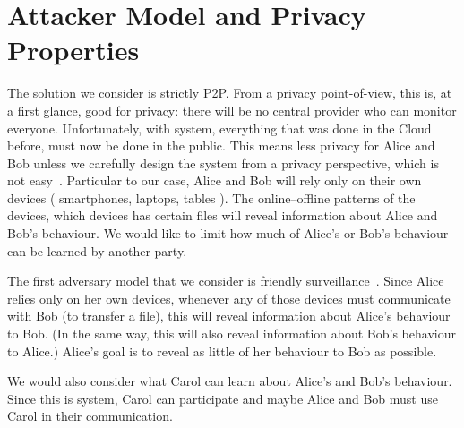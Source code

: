 \section{Attacker Model and Privacy Properties}%
\label{Privacy}

The solution we consider is strictly \ac{P2P}.
From a privacy point-of-view, this is, at a first glance, good for privacy: 
there will be no central provider who can monitor everyone.
Unfortunately, with  system, everything that was done in the Cloud 
before, must now be done in the public.
This means less privacy for Alice and Bob unless we carefully design the system 
from a privacy perspective, which is not easy~\cite{DevilInMetadata}.
Particular to our case, Alice and Bob will rely only on their own devices (\eg 
smartphones, laptops, tables \etc).
The online--offline patterns of the devices, which devices has certain files 
\etc will reveal information about Alice and Bob's behaviour.
We would like to limit how much of Alice's or Bob's behaviour can be learned by 
another party.

The first adversary model that we consider is friendly 
surveillance~\cite{FriendlySurveillance}.
Since Alice relies only on her own devices, whenever any of those devices must 
communicate with Bob (\eg to transfer a file), this will reveal information 
about Alice's behaviour to Bob.
(In the same way, this will also reveal information about Bob's behaviour to 
Alice.)
Alice's goal is to reveal as little of her behaviour to Bob as possible.

We would also consider what Carol can learn about Alice's and Bob's behaviour.
Since this is  system, Carol can participate and maybe Alice and Bob 
must use Carol in their communication.

